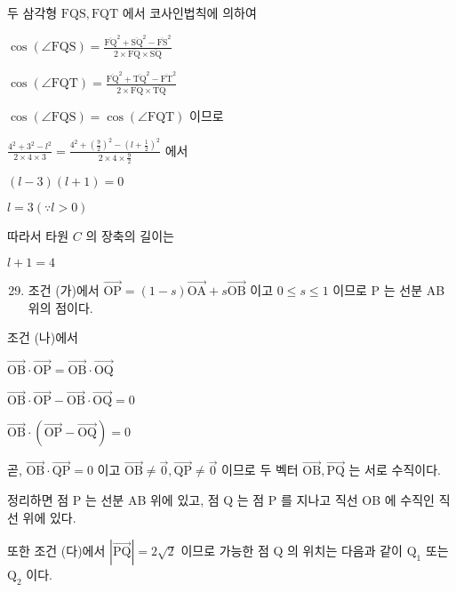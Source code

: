 \documentclass[10pt]{article}
\begin{document}
두 삼각형 $\mathrm{FQS}, \mathrm{FQT}$ 에서 코사인법칙에 의하여

$\cos (\angle \mathrm{FQS})=\frac{\overline{\mathrm{FQ}}^{2}+\overline{\mathrm{SQ}}^{2}-\overline{\mathrm{FS}}^{2}}{2 \times \overline{\mathrm{FQ}} \times \overline{\mathrm{SQ}}}$

$\cos (\angle \mathrm{FQT})=\frac{\overline{\mathrm{FQ}}^{2}+\overline{\mathrm{TQ}}^{2}-\overline{\mathrm{FT}}^{2}}{2 \times \overline{\mathrm{FQ}} \times \overline{\mathrm{TQ}}}$

$\cos (\angle \mathrm{FQS})=\cos (\angle \mathrm{FQT})$ 이므로

$\frac{4^{2}+3^{2}-l^{2}}{2 \times 4 \times 3}=\frac{4^{2}+\left(\frac{9}{2}\right)^{2}-\left(l+\frac{1}{2}\right)^{2}}{2 \times 4 \times \frac{9}{2}}$ 에서

$(l-3)(l+1)=0$

$l=3(\because l>0)$

따라서 타원 $C$ 의 장축의 길이는

$l+1=4$

\begin{enumerate}
  \setcounter{enumi}{28}
  \item 조건 (가)에서 $\overrightarrow{\mathrm{OP}}=(1-s) \overrightarrow{\mathrm{OA}}+s \overrightarrow{\mathrm{OB}}$ 이고 $0 \leq s \leq 1$ 이므로 P 는 선분 AB 위의 점이다.
\end{enumerate}

조건 (나)에서

$\overrightarrow{\mathrm{OB}} \cdot \overrightarrow{\mathrm{OP}}=\overrightarrow{\mathrm{OB}} \cdot \overrightarrow{\mathrm{OQ}}$

$\overrightarrow{\mathrm{OB}} \cdot \overrightarrow{\mathrm{OP}}-\overrightarrow{\mathrm{OB}} \cdot \overrightarrow{\mathrm{OQ}}=0$

$\overrightarrow{\mathrm{OB}} \cdot(\overrightarrow{\mathrm{OP}}-\overrightarrow{\mathrm{OQ}})=0$

곧, $\overrightarrow{\mathrm{OB}} \cdot \overrightarrow{\mathrm{QP}}=0$ 이고 $\overrightarrow{\mathrm{OB}} \neq \overrightarrow{0}, \overrightarrow{\mathrm{QP}} \neq \overrightarrow{0}$ 이므로 두 벡터 $\overrightarrow{\mathrm{OB}}, \overrightarrow{\mathrm{PQ}}$ 는 서로 수직이다.

정리하면 점 P 는 선분 AB 위에 있고, 점 Q 는 점 P 를 지나고 직선 OB 에 수직인 직선 위에 있다.

또한 조건 (다)에서 $|\overrightarrow{\mathrm{PQ}}|=2 \sqrt{2}$ 이므로 가능한 점 Q 의 위치는 다음과 같이 $\mathrm{Q}_{1}$ 또는 $\mathrm{Q}_{2}$ 이다.
\end{document}
